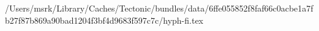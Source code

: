 /Users/msrk/Library/Caches/Tectonic/bundles/data/6ffe055852f8faf66c0acbe1a7fb27f87b869a90bad1204f3bf4d9683f597c7c/hyph-fi.tex